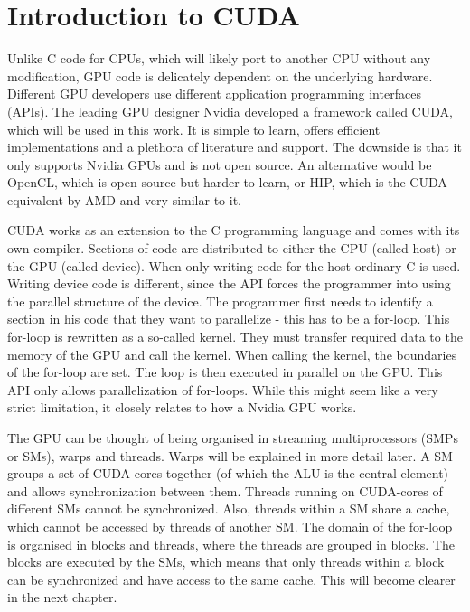 \section{Introduction to CUDA}
Unlike C code for CPUs, which will likely port to another CPU without any modification, GPU code is delicately dependent on the underlying hardware.
Different GPU developers use different application programming interfaces (APIs).
The leading GPU designer Nvidia developed a framework called CUDA, which will be used in this work.
It is simple to learn, offers efficient implementations and a plethora of literature and support.
The downside is that it only supports Nvidia GPUs and is not open source.
An alternative would be OpenCL, which is open-source but harder to learn, or HIP, which is the CUDA equivalent by AMD and very similar to it.

CUDA works as an extension to the C programming language and comes with its own compiler.
Sections of code are distributed to either the CPU (called host) or the GPU (called device).
When only writing code for the host ordinary C is used.
Writing device code is different, since the API forces the programmer into using the parallel structure of the device.
The programmer first needs to identify a section in his code that they want to parallelize - this has to be a for-loop.
This for-loop is rewritten as a so-called kernel.
They must transfer required data to the memory of the GPU and call the kernel.
When calling the kernel, the boundaries of the for-loop are set.
The loop is then executed in parallel on the GPU.
This API only allows parallelization of for-loops.
While this might seem like a very strict limitation, it closely relates to how a Nvidia GPU works.

The GPU can be thought of being organised in streaming multiprocessors (SMPs or SMs), warps and threads.
Warps will be explained in more detail later.
A SM groups a set of CUDA-cores together (of which the ALU is the central element) and allows synchronization between them.
Threads running on CUDA-cores of different SMs cannot be synchronized.
Also, threads within a SM share a cache, which cannot be accessed by threads of another SM.
The domain of the for-loop is organised in blocks and threads, where the threads are grouped in blocks.
The blocks are executed by the SMs, which means that only threads within a block can be synchronized and have access to the same cache.
This will become clearer in the next chapter.
